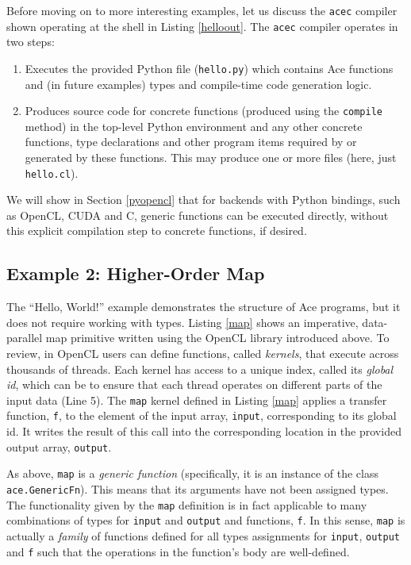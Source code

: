 \documentclass{sig-alternate}
\begin{document}
Before moving on to more interesting examples, let us discuss the \verb|acec| compiler shown operating at the shell in Listing \ref{helloout}. The \verb|acec| compiler operates in two steps:
\begin{enumerate}
\item Executes the provided Python file (\verb|hello.py|) which contains Ace functions and (in future examples) types and compile-time code generation logic.
\item Produces source code for concrete functions (produced using the \verb|compile| method) in the top-level Python environment and any other concrete functions, type declarations and other program items required by or generated by these functions. This may produce one or more files (here, just \verb|hello.cl|).
\end{enumerate}

We will show in Section \ref{pyopencl} that for backends with Python bindings, such as OpenCL, CUDA and C, generic functions can be executed directly, without this explicit compilation step to concrete functions, if desired.

\subsection{Example 2: Higher-Order Map}
The ``Hello, World!'' example demonstrates the structure of Ace programs, but it does not require working with types. Listing \ref{map} shows an imperative, data-parallel map primitive written using the OpenCL library introduced above. To review, in OpenCL users can define functions, called {\em kernels}, that execute across thousands of threads. Each kernel has access to a unique index, called its {\em global id}, which can be to ensure that each thread operates on different parts of the input data (Line 5). The \verb|map| kernel defined in Listing \ref{map} applies a transfer function, \verb|f|, to the element of the input array, \verb|input|, corresponding to its global id. It writes the result of this call into the corresponding location in the provided output array, \verb|output|.

As above, \verb|map| is a {\em generic function} (specifically, it is an instance of the class \verb|ace.GenericFn|). This means that its arguments have not been assigned types. The functionality given by the \verb|map| definition is in fact applicable to many combinations of types for \verb|input| and \verb|output| and functions, \verb|f|. In this sense, \verb|map| is actually a \emph{family} of functions defined for all types assignments for \verb|input|, \verb|output| and \verb|f| such that the operations in the function's body are well-defined.
\end{document}
